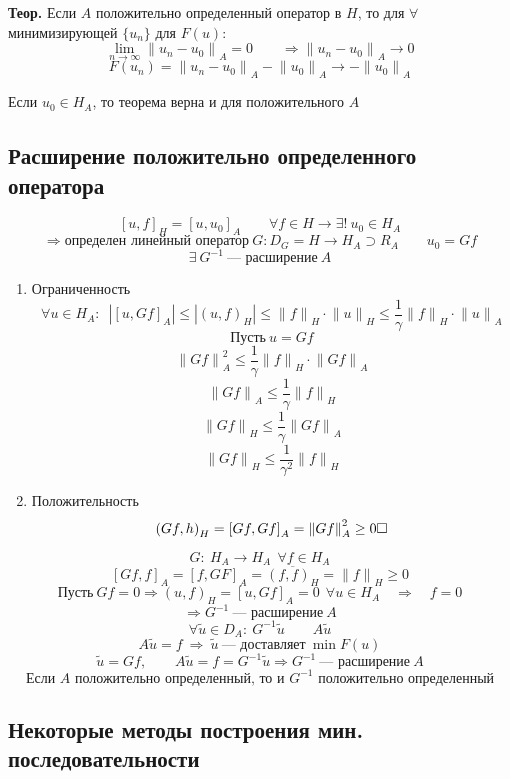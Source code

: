 \textbf{Теор.} Если $A$ положительно определенный оператор в $H$, то для $\forall$ минимизирующей $\{u_n\}$ для $F(u)$:
\[ \underset{n \rightarrow \infty}{\lim} {\| u_n - u_0 \|}_A = 0 \qquad \Rightarrow {\| u_n - u_0 \|}_A \rightarrow 0 \]
\[ F(u_n) = {\| u_n - u_0 \|}_A - {\| u_0 \|}_A \rightarrow -{\| u_0 \|}_A \]

Если $u_0 \in H_A$, то теорема верна и для положительного $A$

\subsection{Расширение положительно определенного оператора}

\[ {[u,f]}_H = {[u,u_0]}_A \qquad \forall f \in H \rightarrow \exists! \ u_0 \in H_A \]
\[ \Rightarrow \text{определен линейный оператор} \ G: D_G = H \rightarrow H_A \supset R_A \qquad u_0 = Gf \]
\[ \exists \ G^{-1} \ \text{--- расширение} \ A \]

\begin{enumerate}
	\item Ограниченность
	\[ \forall u \in H_A: \enspace \left| {[u, Gf]}_A \right| \leq | {(u,f)}_H | \leq {\| f \|}_H \cdot {\| u \|}_H \leq \frac{1}{\gamma} {\| f \|}_H \cdot {\| u \|}_A \]
	\[ \text{Пусть} \ u = Gf \]
	\[ {\| Gf \|}_A^2 \leq  \frac{1}{\gamma} {\| f \|}_H \cdot {\| Gf \|}_A \]
	\[ {\| Gf \|}_A \leq  \frac{1}{\gamma} {\| f \|}_H \]
	\[ {\| Gf \|}_H \leq  \frac{1}{\gamma} {\| Gf \|}_A \]
	\[ {\| Gf \|}_H \leq  \frac{1}{\gamma^2} {\| f \|}_H \]
	\item Положительность
	\[ {(Gf,h)}_H = {[Gf, Gf]}_A = {\| Gf \|}^2_A \geq 0 \hfill \square \]
\end{enumerate}

\[ G: \ H_A \rightarrow H_A \ \ \forall f \in H_A \]
\[ {[Gf,f]}_A = {[f,GF]}_A = \overline{{(f,f)}_H} = {\| f \|}_H \geq 0 \]
\[ \text{Пусть} \ Gf = 0 \Rightarrow {(u,f)}_H = {[u, Gf]}_A = 0 \ \ \forall u \in H_A \quad \Rightarrow \quad f = 0 \]
\[ \Rightarrow G^{-1} \ \text{--- расширение} \ A \]
\[ \forall \tilde{u} \in D_A: \ G^{-1} \tilde{u} \qquad A \tilde{u} \]
\[ A \tilde{u} = f \ \Rightarrow \ \tilde{u} \ \text{--- доставляет} \ \min F(u) \]
\[ \tilde{u} = Gf, \qquad A \tilde{u} = f = G^{-1} \tilde{u} \Rightarrow G^{-1} \ \text{--- расширение} \ A \]
\[ \text{Если $A$ положительно определенный, то и $G^{-1}$ положительно определенный} \]


\subsection{Некоторые методы построения мин. последовательности}

